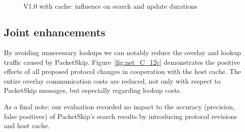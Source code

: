 \begin{figure}[htbp]
{  }
  \\[-1ex]
  \\[-1ex]

  \caption{V1.0 with cache: influence on search and update durations}
  \label{fig:durations_cache}
\end{figure}






\subsection{Joint enhancements}
\label{subsec:12c}

By avoiding unnecessary lookups we can notably reduce the overlay and lookup traffic caused by PacketSkip. Figure~\ref{fig:net_C_12c} demonstrates the positive effects of all proposed protocol changes in cooperation with the host cache. The entire overlay communication costs are reduced, not only with respect to PacketSkip messages, but especially regarding lookup costs.

As a final note: our evaluation recorded no impact to the accuracy (precision, false positives) of PacketSkip's search results by introducing protocol revisions and host cache.

